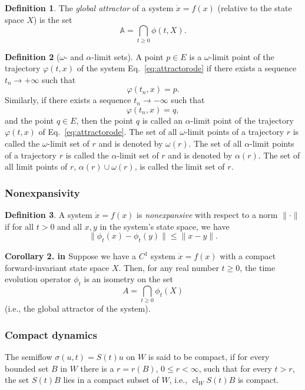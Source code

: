 \documentclass{article}
\theoremstyle{definition} \newtheorem{definition}{Definition}
\theoremstyle{remark} \newtheorem{remark}{Remark}
\newcommand{\cl}{\operatorname{cl}}
\newcounter{ct}
\begin{document}
\begin{definition}
The \textit{global attractor} of a system \( \dot{x} = f(x) \) (relative to the state space \( X \)) is the set  
\[
\mathbb{A} = \bigcap_{t \geq 0} \phi(t,X).
\]
\end{definition}

\begin{definition}[\(\omega\)- and \(\alpha\)-limit sets]\label{def:omega}
A point \( p \in E \) is a \(\omega\)-limit point of the trajectory \( \varphi(t, x) \) of the system Eq.~\ref{eq:attractorode} if there exists a sequence \( t_n \to +\infty \) such that
\[
\varphi(t_n, x) = p.
\]
Similarly, if there exists a sequence \( t_n \to -\infty \) such that
\[
\varphi(t_n, x) = q,
\]
and the point \( q \in E \), then the point \( q \) is called an \(\alpha\)-limit point of the trajectory \( \varphi(t, x) \) of  Eq.~\ref{eq:attractorode}. The set of all \(\omega\)-limit points of a trajectory \( r \) is called the \(\omega\)-limit set of \( r \) and is denoted by \( \omega(r) \). The set of all \(\alpha\)-limit points of a trajectory \( r \) is called the \(\alpha\)-limit set of \( r \) and is denoted by \( \alpha(r) \). The set of all limit points of \( r \), \( \alpha(r) \cup \omega(r) \), is called the limit set of \( r \).
\end{definition}

\subsubsection{Nonexpansivity}
\begin{definition}\label{def:nonexpansive}
A system \( \dot{x} = f(x) \) is \textit{nonexpansive} with respect to a norm \( \|\cdot\| \) if for all \( t > 0 \) and all \( x, y \) in the system’s state space, we have  
\[
\|\phi_t(x) - \phi_t(y)\| \leq \|x - y\|.
\]
\end{definition}


\textbf{Corollary 2. in \citep{duvall2024remark}} Suppose we have a \( C^1 \) system \( \dot{x} = f(x) \) with a compact forward-invariant state space \( X \). Then, for any real number \( t \geq 0 \), the time evolution operator \( \phi_t \) is an isometry on the set  
\[
A = \bigcap_{t \geq 0} \phi_t(X)
\]  
(i.e., the global attractor of the system).


\subsubsection{Compact dynamics}
The semiflow $\sigma(u, t) = S(t)u$ on $W$ is said to be compact, if for every bounded set $B$ in $W$ there is a $r = r(B)$, $0 \leq r < \infty$, such that for every $t> r$, the set $S(t)B$ lies in a compact subset of $W$, i.e., $\cl_WS(t)B$ is compact. 
\end{document}

